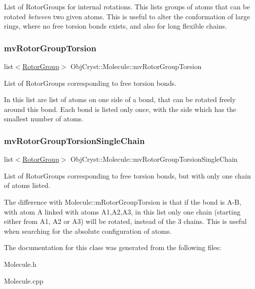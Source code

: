 List of Rotor\+Groups for internal rotations. This lists groups of atoms that can be rotated {\itshape between} two given atoms. This is useful to alter the conformation of large rings, where no free torsion bonds exists, and also for long flexible chains. \mbox{\label{class_obj_cryst_1_1_molecule_afc51d36109a8d96a626f3c2251345c13}} 
\subsubsection{\texorpdfstring{mvRotorGroupTorsion}{mvRotorGroupTorsion}}
{\footnotesize\ttfamily list$<$\mbox{\hyperlink{struct_obj_cryst_1_1_molecule_1_1_rotor_group}{Rotor\+Group}}$>$ Obj\+Cryst\+::\+Molecule\+::mv\+Rotor\+Group\+Torsion\hspace{0.3cm}{\ttfamily [mutable]}}

List of Rotor\+Groups corresponding to free torsion bonds.

In this list are list of atoms on one side of a bond, that can be rotated freely around this bond. Each bond is listed only once, with the side which has the smallest number of atoms. \mbox{\label{class_obj_cryst_1_1_molecule_a22a07ddc2dbfeb90238b29bcca1e915d}} 
\subsubsection{\texorpdfstring{mvRotorGroupTorsionSingleChain}{mvRotorGroupTorsionSingleChain}}
{\footnotesize\ttfamily list$<$\mbox{\hyperlink{struct_obj_cryst_1_1_molecule_1_1_rotor_group}{Rotor\+Group}}$>$ Obj\+Cryst\+::\+Molecule\+::mv\+Rotor\+Group\+Torsion\+Single\+Chain\hspace{0.3cm}{\ttfamily [mutable]}}

List of Rotor\+Groups corresponding to free torsion bonds, but with only one chain of atoms listed.

The difference with Molecule\+::m\+Rotor\+Group\+Torsion is that if the bond is A-\/B, with atom A linked with atoms A1,A2,A3, in this list only one chain (starting either from A1, A2 or A3) will be rotated, instead of the 3 chains. This is useful when searching for the absolute configuration of atoms. 

The documentation for this class was generated from the following files\+:\begin{DoxyCompactItemize}
\item 
Molecule.\+h\item 
Molecule.\+cpp\end{DoxyCompactItemize}
